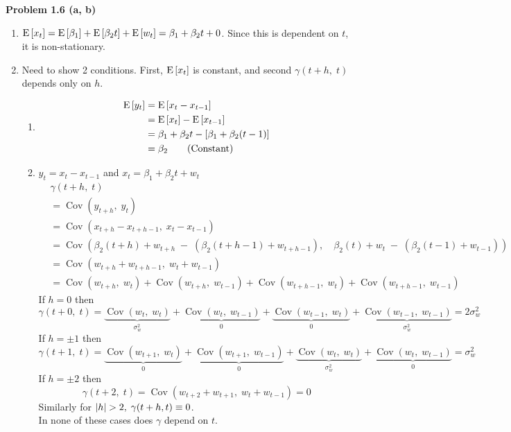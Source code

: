 \documentclass[12pt]{article}
\def\Cov{\operatorname{Cov}} %
\begin{document}
\textbf{Problem 1.6 (a, b)}
\begin{enumerate}[label=(\alph*)]
    \item $\Eb{x_t} = \Eb{\beta_1} + \Eb{\beta_2 t} + \Eb{w_t} = \beta_1 + \beta_2 t  + 0$. Since this is dependent on $t$, it is non-stationary.
    \item Need to show 2 conditions. First, $\Eb{x_t}$ is constant, and second $\gamma(t+h, \; t)$ depends only on $h$. \begin{enumerate}[label=(\arabic*)]
        \item \begin{align*}
            \Eb{y_t} &= \Eb{x_t - x_{t-1}}\\
            &= \Eb{x_t} - \Eb{x_{t-1}}\\
            &=  \beta_1 + \beta_2 t - \brac{ \beta_1 + \beta_2 (t-1)}\\
            &= \beta_2 \tag{Constant}
        \end{align*}
        \item $y_t = x_t - x_{t-1}$ and $x_t = \beta_1 + \beta_2 t + w_t$ \begin{align*}
            & \gamma(t+h, \; t)
            \\ &= \Cov(y_{t+h},\; y_t)
            \\ &= \Cov(x_{t+h} - x_{t+h-1},\; x_t - x_{t-1})\\
            &= \Cov(\beta_2 (t+h) + w_{t+h} \; - \; (\beta_2 (t+h-1) + w_{t+h-1} ), \quad \beta_2 (t) + w_{t} \; - \; (\beta_2 (t-1) + w_{t-1} )) \\
            &= \Cov(w_{t+h} + w_{t+h-1},\; w_t + w_{t-1})\\
            &= \Cov(w_{t+h},\; w_t) +  \Cov(w_{t+h},\; w_{t-1}) +  \Cov(w_{t+h-1},\; w_t) +  \Cov(w_{t+h-1},\; w_{t-1})
        \end{align*}
        If $h = 0$ then $$\gamma(t+0,\; t) = \underbrace{\Cov(w_{t},\; w_t)}_{\sigma_w^{2}} +
         \underbrace{\Cov(w_{t},\; w_{t-1})}_{0} +  \underbrace{\Cov(w_{t-1},\; w_t)}_{0} +  \underbrace{\Cov(w_{t-1},\; w_{t-1})}_{\sigma_w^{2}} = 2\sigma_w^2$$
         If $h = \pm 1$ then $$\gamma(t+1,\; t) = \underbrace{\Cov(w_{t+1},\; w_t)}_{0} +
         \underbrace{\Cov(w_{t+1},\; w_{t-1})}_{0} +  \underbrace{\Cov(w_{t},\; w_t)}_{\sigma_w^{2}} +  \underbrace{\Cov(w_{t},\; w_{t-1})}_{0} = \sigma_w^2$$
        If $h = \pm 2$ then $$\gamma(t+2, \; t) = \Cov(w_{t+2} + w_{t+1},\; w_t + w_{t-1}) = 0$$
        Similarly for $\abs{h} > 2,\; \gamma(t+h, t) \equiv 0$. 
        \\In none of these cases does $\gamma$ depend on $t$. 
    \end{enumerate}
\end{enumerate}
\end{document}
